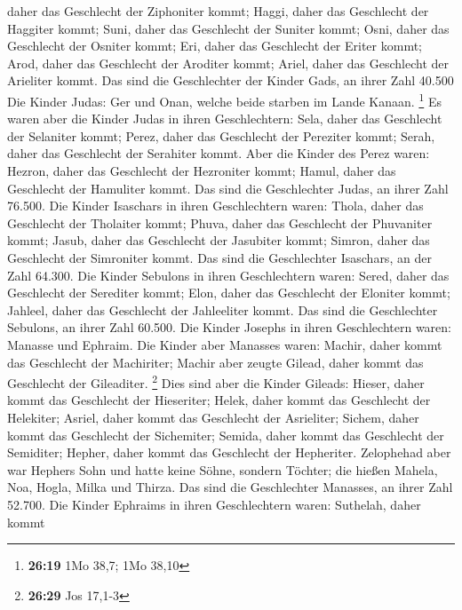 daher das Geschlecht der Ziphoniter kommt; Haggi, daher das Geschlecht
der Haggiter kommt; Suni, daher das Geschlecht der Suniter kommt;
 Osni, daher das Geschlecht der Osniter kommt; Eri, daher
das Geschlecht der Eriter kommt;  Arod, daher das
Geschlecht der Aroditer kommt; Ariel, daher das Geschlecht der Arieliter
kommt.  Das sind die Geschlechter der Kinder Gads, an
ihrer Zahl 40.500  Die Kinder Judas: Ger und Onan, welche
beide starben im Lande Kanaan. \footnote{\textbf{26:19} 1Mo 38,7; 1Mo
  38,10}  Es waren aber die Kinder Judas in ihren
Geschlechtern: Sela, daher das Geschlecht der Selaniter kommt; Perez,
daher das Geschlecht der Pereziter kommt; Serah, daher das Geschlecht
der Serahiter kommt.  Aber die Kinder des Perez waren:
Hezron, daher das Geschlecht der Hezroniter kommt; Hamul, daher das
Geschlecht der Hamuliter kommt.  Das sind die
Geschlechter Judas, an ihrer Zahl 76.500.  Die Kinder
Isaschars in ihren Geschlechtern waren: Thola, daher das Geschlecht der
Tholaiter kommt; Phuva, daher das Geschlecht der Phuvaniter kommt;
 Jasub, daher das Geschlecht der Jasubiter kommt; Simron,
daher das Geschlecht der Simroniter kommt.  Das sind die
Geschlechter Isaschars, an der Zahl 64.300.  Die Kinder
Sebulons in ihren Geschlechtern waren: Sered, daher das Geschlecht der
Serediter kommt; Elon, daher das Geschlecht der Eloniter kommt; Jahleel,
daher das Geschlecht der Jahleeliter kommt.  Das sind die
Geschlechter Sebulons, an ihrer Zahl 60.500.  Die Kinder
Josephs in ihren Geschlechtern waren: Manasse und Ephraim.
 Die Kinder aber Manasses waren: Machir, daher kommt das
Geschlecht der Machiriter; Machir aber zeugte Gilead, daher kommt das
Geschlecht der Gileaditer. \footnote{\textbf{26:29} Jos 17,1-3}
 Dies sind aber die Kinder Gileads: Hieser, daher kommt
das Geschlecht der Hieseriter; Helek, daher kommt das Geschlecht der
Helekiter;  Asriel, daher kommt das Geschlecht der
Asrieliter; Sichem, daher kommt das Geschlecht der Sichemiter;
 Semida, daher kommt das Geschlecht der Semiditer;
Hepher, daher kommt das Geschlecht der Hepheriter. 
Zelophehad aber war Hephers Sohn und hatte keine Söhne, sondern Töchter;
die hießen Mahela, Noa, Hogla, Milka und Thirza.  Das
sind die Geschlechter Manasses, an ihrer Zahl 52.700. 
Die Kinder Ephraims in ihren Geschlechtern waren: Suthelah, daher kommt
